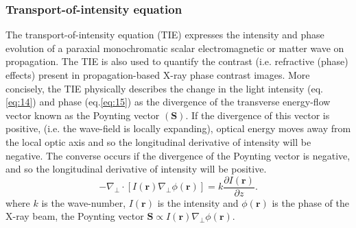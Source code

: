 \documentclass[10pt, a4paper, singlespacing]{report}
\begin{document}
\subsubsection{Transport-of-intensity equation}\label{TIE}
The transport-of-intensity equation (TIE) expresses the intensity and phase evolution of a paraxial monochromatic scalar electromagnetic or matter wave on propagation\cite{Pags2002}. The TIE is also used to quantify the contrast (i.e. refractive (phase) effects) present in propagation-based X-ray phase contrast images\cite{PagsTutes}.
More concisely, the TIE physically describes the change in the light intensity (eq.\ref{eq:14}) and phase (eq.\ref{eq:15}) as the divergence of the transverse energy-flow vector known as the Poynting vector $(\textbf{S})$. If the divergence of this vector is positive, (i.e. the wave-field is locally expanding), optical energy moves away from the local optic axis and so the longitudinal derivative of
intensity will be negative. The converse occurs if the divergence of the Poynting vector is negative, and so the longitudinal derivative of intensity will be positive\cite{PagsTutes}.
\begin{equation}\label{eq:16}
-\nabla_{\perp} \cdot [I(\mathbf{r}) \nabla_{\perp} \phi(\mathbf{r})] = k \frac{\partial I (\mathbf{r})}{\partial z}.
\end{equation}
where $k$ is the wave-number, $I(\mathbf{r})$ is the intensity and $\phi(\mathbf{r})$ is the phase of the X-ray beam, the Poynting vector $\textbf{S} \propto I(\mathbf{r}) \nabla_{\perp} \phi(\mathbf{r})$.

\end{document}
